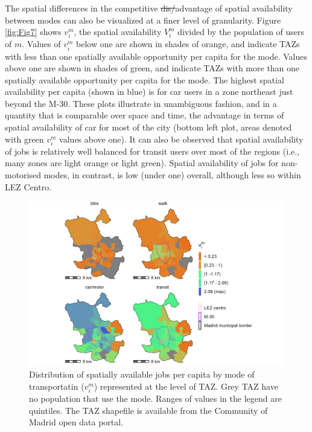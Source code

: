 \documentclass[10pt,letterpaper]{article}
\providecommand{\DIFaddtex}[1]{{\protect\color{blue}\uwave{#1}}} %
\providecommand{\DIFdeltex}[1]{{\protect\color{red}\sout{#1}}}                      %
\providecommand{\DIFaddbegin}{} %
\providecommand{\DIFaddend}{} %
\providecommand{\DIFdelbegin}{} %
\providecommand{\DIFdelend}{} %
\providecommand{\DIFadd}[1]{\texorpdfstring{\DIFaddtex{#1}}{#1}} %
\providecommand{\DIFdel}[1]{\texorpdfstring{\DIFdeltex{#1}}{}} %
\newcommand{\DIFscaledelfig}{0.5}
\newlength{\DIFdelgraphicswidth} %
\newlength{\DIFdelgraphicsheight} %
\newcommand{\DIFaddincludegraphics}[2][]{{\color{blue}\fbox{\DIFOincludegraphics[#1]{#2}}}} %
\newcommand{\DIFdelincludegraphics}[2][]{%
\sbox{\DIFdelgraphicsbox}{\DIFOincludegraphics[#1]{#2}}%
\settoboxwidth{\DIFdelgraphicswidth}{\DIFdelgraphicsbox} %
\settoboxtotalheight{\DIFdelgraphicsheight}{\DIFdelgraphicsbox} %
\scalebox{\DIFscaledelfig}{%
\parbox[b]{\DIFdelgraphicswidth}{\usebox{\DIFdelgraphicsbox}\\[-\baselineskip] \rule{\DIFdelgraphicswidth}{0em}}\llap{\resizebox{\DIFdelgraphicswidth}{\DIFdelgraphicsheight}{%
\setlength{\unitlength}{\DIFdelgraphicswidth}%
\begin{picture}(1,1)%
\thicklines\linethickness{2pt} %
{\color[rgb]{1,0,0}\put(0,0){\framebox(1,1){}}}%
{\color[rgb]{1,0,0}\put(0,0){\line( 1,1){1}}}%
{\color[rgb]{1,0,0}\put(0,1){\line(1,-1){1}}}%
\end{picture}%
}\hspace*{3pt}}} %
} %
\DeclareRobustCommand{\DIFaddbegin}{\DIFOaddbegin \let\includegraphics\DIFaddincludegraphics} %
\DeclareRobustCommand{\DIFaddend}{\DIFOaddend \let\includegraphics\DIFOincludegraphics} %
\DeclareRobustCommand{\DIFdelbegin}{\DIFOdelbegin \let\includegraphics\DIFdelincludegraphics} %
\DeclareRobustCommand{\DIFdelend}{\DIFOaddend \let\includegraphics\DIFOincludegraphics} %
\begin{document}
The spatial differences in the competitive \DIFdelbegin \DIFdel{dis/}\DIFdelend \DIFaddbegin \DIFadd{(dis)}\DIFaddend advantage of spatial
availability between modes can also be visualized at a finer level of
granularity. Figure \ref{fig:Fig7} shows \(v_i^m\), the spatial
availability \(V_i^m\) divided by the population of users of \(m\).
Values of \(v_i^m\) below one are shown in shades of orange, and
indicate TAZs with less than one spatially available opportunity per
capita for the mode. Values above one are shown in shades of green, and
indicate TAZs with more than one spatially available opportunity per
capita for the mode. The highest spatial availability per capita (shown
in blue) is for car users in a zone northeast just beyond the M-30.
These plots illustrate in unambiguous fashion, and in a quantity that is
comparable over space and time, the advantage in terms of spatial
availability of car for most of the city (bottom left plot, areas
denoted with green \(v_i^m\) values above one). It can also be observed
that spatial availability of jobs is relatively well balanced for
transit users over most of the regions (i.e., many zones are light
orange or light green). Spatial availability of jobs for non-motorised
modes, in contrast, is low (under one) overall, although less so within
LEZ Centro.

\begin{figure}

{\centering \includegraphics[width=0.85\linewidth]{images/Fig7} 

}

\caption{\label{fig:Fig7} Distribution of spatially available jobs per capita by mode of transportatin ($v_i^m$) represented at the level of TAZ. Grey TAZ have no population that use the mode. Ranges of values in the legend are quintiles. The TAZ shapefile is available from the Community of Madrid open data portal.}\label{fig:SA-per-capita-m-plot}
\end{figure}
\end{document}
